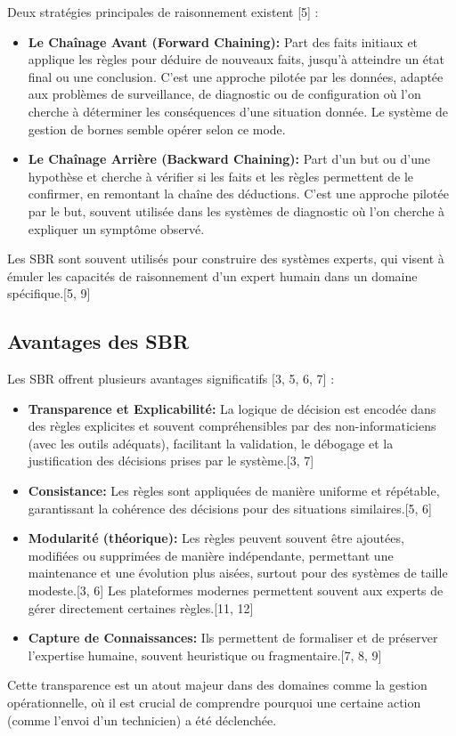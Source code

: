 \documentclass[11pt,a4paper]{article}
\begin{document}
Deux stratégies principales de raisonnement existent [5] :
\begin{itemize}
    \item \textbf{Le Chaînage Avant (Forward Chaining):} Part des faits initiaux et applique les règles pour déduire de nouveaux faits, jusqu'à atteindre un état final ou une conclusion. C'est une approche pilotée par les données, adaptée aux problèmes de surveillance, de diagnostic ou de configuration où l'on cherche à déterminer les conséquences d'une situation donnée. Le système de gestion de bornes semble opérer selon ce mode.
    \item \textbf{Le Chaînage Arrière (Backward Chaining):} Part d'un but ou d'une hypothèse et cherche à vérifier si les faits et les règles permettent de le confirmer, en remontant la chaîne des déductions. C'est une approche pilotée par le but, souvent utilisée dans les systèmes de diagnostic où l'on cherche à expliquer un symptôme observé.
\end{itemize}

Les SBR sont souvent utilisés pour construire des systèmes experts, qui visent à émuler les capacités de raisonnement d'un expert humain dans un domaine spécifique.[5, 9]

\subsection{Avantages des SBR}

Les SBR offrent plusieurs avantages significatifs [3, 5, 6, 7] :
\begin{itemize}
    \item \textbf{Transparence et Explicabilité:} La logique de décision est encodée dans des règles explicites et souvent compréhensibles par des non-informaticiens (avec les outils adéquats), facilitant la validation, le débogage et la justification des décisions prises par le système.[3, 7]
    \item \textbf{Consistance:} Les règles sont appliquées de manière uniforme et répétable, garantissant la cohérence des décisions pour des situations similaires.[5, 6]
    \item \textbf{Modularité (théorique):} Les règles peuvent souvent être ajoutées, modifiées ou supprimées de manière indépendante, permettant une maintenance et une évolution plus aisées, surtout pour des systèmes de taille modeste.[3, 6] Les plateformes modernes permettent souvent aux experts de gérer directement certaines règles.[11, 12]
    \item \textbf{Capture de Connaissances:} Ils permettent de formaliser et de préserver l'expertise humaine, souvent heuristique ou fragmentaire.[7, 8, 9]
\end{itemize}
Cette transparence est un atout majeur dans des domaines comme la gestion opérationnelle, où il est crucial de comprendre pourquoi une certaine action (comme l'envoi d'un technicien) a été déclenchée.
\end{document}
